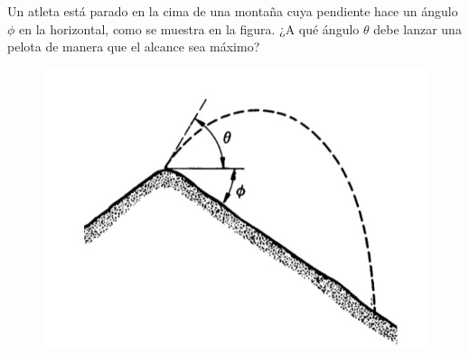 \documentclass[../main.tex]{subfiles}
\begin{document}
\begin{problema}
	Un atleta está parado en la cima de una montaña cuya pendiente hace
	un ángulo \(\phi\) en la horizontal, como se muestra en la figura.
	¿A qué ángulo \(\theta\) debe lanzar una pelota de manera
	que el alcance sea máximo?

	\begin{figure}[htp]
		\centering
		\includegraphics[scale=.4,trim={2cm 1cm 1.2cm 1.2cm}, clip]{../figs/problema_02.jpg}
	\end{figure}
\end{problema}
\end{document}
